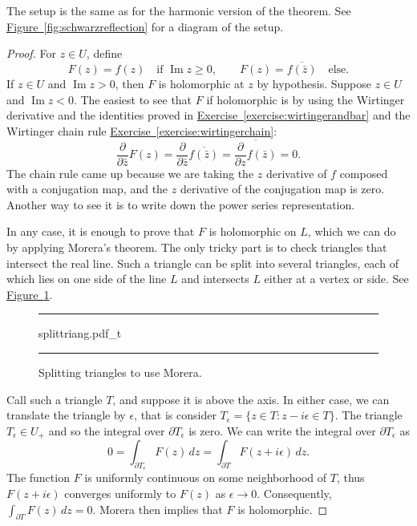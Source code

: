 \documentclass[12pt,openany]{book}
\renewcommand{\Im}{\operatorname{Im}}
\theoremstyle{plain}
\theoremstyle{remark}
\theoremstyle{definition}
\newenvironment{myfig}{%
\begin{figure}[h!t]
\noindent\rule{\textwidth}{0.5pt}\vspace{12pt}\par\centering}%
{\par\noindent\rule{\textwidth}{0.5pt}
\end{figure}}
\theoremstyle{exercise}
\theoremstyle{example}
\newcommand{\figureref}[1]{\hyperref[#1]{Figure~\ref*{#1}}}
\newcommand{\exerciseref}[1]{\hyperref[#1]{Exercise~\ref*{#1}}}
\begin{document}
The setup is the same as for the harmonic version of the theorem.
See \figureref{fig:schwarzreflection} for a diagram of the setup.

\begin{proof}
For $z \in U$, define
\begin{equation*}
F(z) =
f(z) \quad \text{if } \Im z \geq 0,
\qquad
F(z) =
\overline{f(\bar{z})} \quad \text{else} .
\end{equation*}
If $z \in U$ and $\Im z > 0$, then $F$ is holomorphic at $z$ by hypothesis.
Suppose $z \in U$ and $\Im z < 0$.  The easiest to see that $F$
if holomorphic is by using the Wirtinger derivative and the
identities proved in \exerciseref{exercise:wirtingerandbar} and
the Wirtinger chain rule \exerciseref{exercise:wirtingerchain}:
\begin{equation*}
\frac{\partial}{\partial \bar{z}}
F(z)
=
\frac{\partial}{\partial \bar{z}}
\overline{f(\bar{z})}
=
\overline{
\frac{\partial}{\partial z}
f(\bar{z})
}
=
0 .
\end{equation*}
The chain rule came up because we are taking the $z$ derivative of $f$
composed with a conjugation map, and the $z$ derivative of the conjugation
map is zero.
Another way to see it is to write down the power series representation.

In any case, it is enough to prove that $F$ is holomorphic on $L$,
which we can do by applying Morera's theorem.  The only
tricky part is to check
triangles that intersect the real line.  Such a triangle can be split into
several triangles, each of which lies on one side of the line $L$ and
intersects $L$ either at a vertex or side.  See \figureref{fig:splittriang}.

\begin{myfig}
{splittriang.pdf_t}
\caption{Splitting triangles to use Morera.\label{fig:splittriang}}
\end{myfig}

Call such a triangle $T$, and suppose it is above the axis.
In either case, we can translate the triangle by $\epsilon$, that is
consider $T_\epsilon = \{ z \in T : z-i\epsilon \in T \}$.
The triangle $T_\epsilon \in U_+$ and so
the integral over $\partial T_\epsilon$
is zero.  We can write the integral over $\partial T_\epsilon$
as
\begin{equation*}
0 = \int_{\partial T_\epsilon} F(z) \, dz =
\int_{\partial T} F(z+i\epsilon) \, dz .
\end{equation*}
The function $F$ is uniformly continuous on some neighborhood of $T$,
thus $F(z+i\epsilon)$ converges uniformly to $F(z)$ as $\epsilon \to 0$.
Consequently, $\int_{\partial T} F(z) \, dz = 0$.
Morera then implies that $F$ is holomorphic.
\end{proof}
\end{document}
